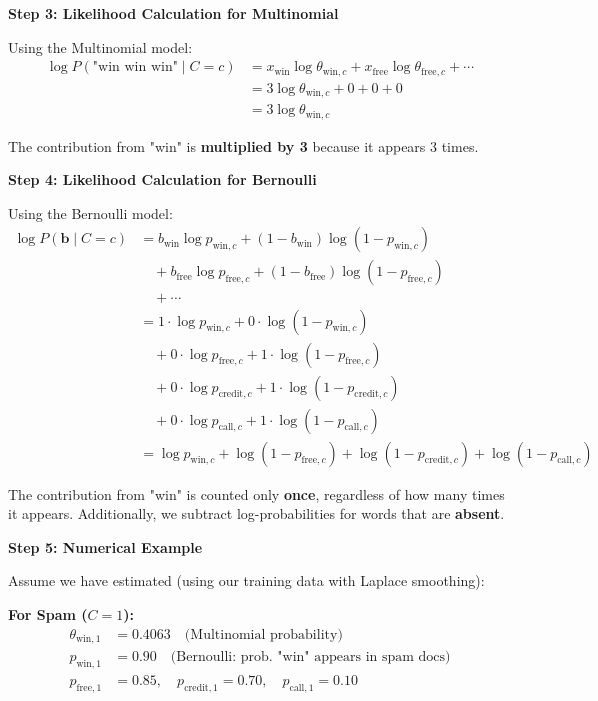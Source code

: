 \documentclass[12pt]{article}
\begin{document}
\begin{solution}
\textbf{Step 3: Likelihood Calculation for Multinomial}

Using the Multinomial model:
\begin{align*}
\log P(\text{"win win win"} \mid C=c) &= x_{\text{win}} \log \theta_{\text{win},c} + x_{\text{free}} \log \theta_{\text{free},c} + \cdots \\
&= 3 \log \theta_{\text{win},c} + 0 + 0 + 0 \\
&= 3 \log \theta_{\text{win},c}
\end{align*}

The contribution from "win" is \textbf{multiplied by 3} because it appears 3 times.

\textbf{Step 4: Likelihood Calculation for Bernoulli}

Using the Bernoulli model:
\begin{align*}
\log P(\mathbf{b} \mid C=c) &= b_{\text{win}} \log p_{\text{win},c} + (1-b_{\text{win}}) \log(1-p_{\text{win},c}) \\
&\quad + b_{\text{free}} \log p_{\text{free},c} + (1-b_{\text{free}}) \log(1-p_{\text{free},c}) \\
&\quad + \cdots \\
&= 1 \cdot \log p_{\text{win},c} + 0 \cdot \log(1-p_{\text{win},c}) \\
&\quad + 0 \cdot \log p_{\text{free},c} + 1 \cdot \log(1-p_{\text{free},c}) \\
&\quad + 0 \cdot \log p_{\text{credit},c} + 1 \cdot \log(1-p_{\text{credit},c}) \\
&\quad + 0 \cdot \log p_{\text{call},c} + 1 \cdot \log(1-p_{\text{call},c}) \\
&= \log p_{\text{win},c} + \log(1-p_{\text{free},c}) + \log(1-p_{\text{credit},c}) + \log(1-p_{\text{call},c})
\end{align*}

The contribution from "win" is counted only \textbf{once}, regardless of how many times it appears. Additionally, we subtract log-probabilities for words that are \textbf{absent}.

\textbf{Step 5: Numerical Example}

Assume we have estimated (using our training data with Laplace smoothing):

\textbf{For Spam ($C=1$):}
\begin{align*}
\theta_{\text{win},1} &= 0.4063 \quad \text{(Multinomial probability)} \\
p_{\text{win},1} &= 0.90 \quad \text{(Bernoulli: prob. "win" appears in spam docs)} \\
p_{\text{free},1} &= 0.85, \quad p_{\text{credit},1} = 0.70, \quad p_{\text{call},1} = 0.10
\end{align*}


\end{solution}
\end{document}
